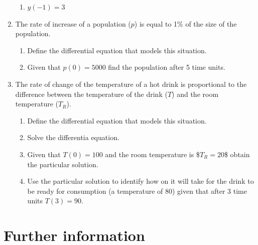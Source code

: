 \begin{enumerate}
\begin{enumerate}
\item 

\(y(-1) = 3\)

\end{enumerate}

\item 

The rate of increase of a population (\(p\)) is equal to 1\% of the size of the
population.
\begin{enumerate}

\item 

Define the differential equation that models this situation.

\item 

Given that \(p(0)=5000\) find the population after 5 time units.

\end{enumerate}

\item 

The rate of change of the temperature of a hot drink is proportional to the
difference between the temperature of the drink (\(T\)) and the room temperature (\(T_R\)).
\begin{enumerate}

\item 

Define the differential equation that models this situation.

\item 

Solve the differentia equation.

\item 

Given that \(T(0) = 100\) and the room temperature is \$\(T_R=20\)\$ obtain the
particular solution.

\item 

Use the particular solution to identify how on it will take for the drink
to be ready for consumption (a temperature of 80) given that after 3 time
units \(T(3)=90\).

\end{enumerate}

\end{enumerate}

\section{Further information}
\label{\detokenize{tools-for-mathematics/09-differential-equations/why/main:further-information}}\label{\detokenize{tools-for-mathematics/09-differential-equations/why/main::doc}}

